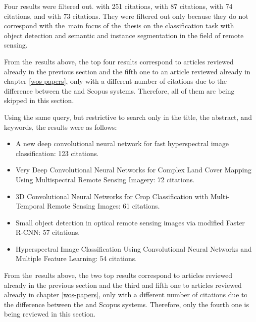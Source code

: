 Four results were filtered out. \cite{dl-for-cv} with 251 citations, \cite{dl-lungs} with 87 citations, \cite{maoxian-landslide} with 74 citations, and \cite{state-of-the-art-dl} with 73 citations. They were filtered out only because they do not correspond with the~main focus of the~thesis on the classification task with object detection and semantic and instance segmentation in the field of remote sensing.

From the~results above, the top four results correspond to articles reviewed already in the previous section and the fifth one to an article reviewed already in chapter \ref{wos-papers}, only with a different number of citations due to the difference between the  and Scopus systems. Therefore, all of them are being skipped in this section.

Using the same query, but restrictive to search only in the title, the abstract, and keywords, the results were as follows:

\begin{itemize}
	\item A new deep convolutional neural network for fast hyperspectral image classification: 123 citations.  \cite{cnn-hs-class}
	\item Very Deep Convolutional Neural Networks for Complex Land Cover Mapping Using Multispectral Remote Sensing Imagery: 72 citations. \cite{very-deep-cnn-lc}
	\item 3D Convolutional Neural Networks for Crop Classification with Multi-Temporal Remote Sensing Images: 61 citations. \cite{3d-cnn-crop}
	\item Small object detection in optical remote sensing images via modified Faster R-CNN: 57 citations. \cite{modified-faster-rcnn-small-objects}
	\item Hyperspectral Image Classification Using Convolutional Neural Networks and Multiple Feature Learning: 54 citations. \cite{hyperspectral-multiple-feat-cnn}
\end{itemize}

From the~results above, the two top results correspond to articles reviewed already in the previous section and the third and fifth one to articles reviewed already in chapter \ref{wos-papers}, only with a different number of citations due to the difference between the  and Scopus systems. Therefore, only the fourth one is being reviewed in this section.

